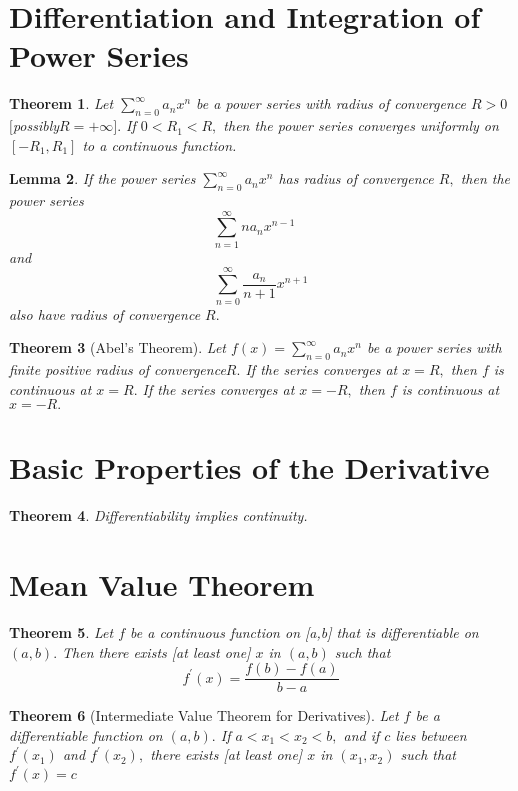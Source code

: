 \documentclass[12pt]{article}
\newtheorem{theorem}{Theorem}[section]
\newtheorem{lemma}[theorem]{Lemma}
\begin{document}
\section{Differentiation and Integration of Power Series}
\begin{theorem}
	Let $\sum _ { n = 0 } ^ { \infty } a _ { n } x ^ { n }$ be a power series with radius of convergence $R > 0$
	$[$possibly$R = + \infty ] .$ If $0 < R _ { 1 } < R ,$ then the power series converges
	uniformly on $\left[ - R _ { 1 } , R _ { 1 } \right]$ to a continuous function.
\end{theorem}
\begin{lemma}
	If the power series $\sum _ { n = 0 } ^ { \infty } a _ { n } x ^ { n }$ has radius of convergence $R ,$ then the
	power series
	$$\sum _ { n = 1 } ^ { \infty } n a _ { n } x ^ { n - 1 } \quad$$ and $$\sum _ { n = 0 } ^ { \infty } \frac { a _ { n } } { n + 1 } x ^ { n + 1 }$$ also have radius of convergence $R .$
\end{lemma}

\begin{theorem}[Abel’s Theorem]
	Let $f ( x ) = \sum _ { n = 0 } ^ { \infty } a _ { n } x ^ { n }$ be a power series with finite positive radius of
	convergence$R .$ If the series converges at $x = R ,$ then $f$ is continuous
	at $x = R .$ If the series converges at $x = - R ,$ then $f$ is continuous
	at $x = - R .$
\end{theorem}

\section{Basic Properties of the Derivative}
\begin{theorem}
	Differentiability implies continuity.
\end{theorem}

\section{Mean Value Theorem}
\begin{theorem}
	Let $f$ be a continuous function on [a,b] that is differentiable on $( a , b ) .$
	Then there exists [at least one] $x$ in $( a , b )$ such that $$
	f ^ { \prime } ( x ) = \frac { f ( b ) - f ( a ) } { b - a }
	$$
\end{theorem}
\begin{theorem}[Intermediate Value Theorem for Derivatives]
	Let $f$ be a differentiable function on $( a , b ) .$ If $a < x _ { 1 } < x _ { 2 } < b ,$ and if $c$ lies between $f ^ { \prime } \left( x _ { 1 } \right)$ and $f ^ { \prime } \left( x _ { 2 } \right) ,$ there exists [at least one] $x$ in
	$\left( x _ { 1 } , x _ { 2 } \right)$ such that $f ^ { \prime } ( x ) = c$
\end{theorem}
\end{document}
